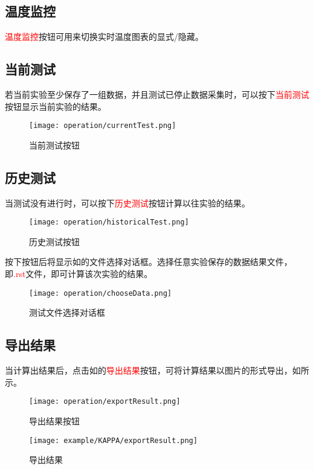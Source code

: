 \subsection{温度监控}
\textcolor{red}{温度监控}按钮可用来切换实时温度图表的显式/隐藏。

\subsection{当前测试}
若当前实验至少保存了一组数据，并且测试已停止数据采集时，可以按下\textcolor{red}{当前测试}按钮显示当前实验的结果。
\begin{figure}[H]
    \centering
    \texttt{[image: operation/currentTest.png]}
    \caption{ 当前测试按钮 \label{fig:btnCurrentTest}}
\end{figure}
\subsection{历史测试}
当测试没有进行时，可以按下\textcolor{red}{历史测试}按钮计算以往实验的结果。
\begin{figure}[H]
    \centering
    \texttt{[image: operation/historicalTest.png]}
    \caption{ 历史测试按钮 \label{fig:btnHistoricalTest}}
\end{figure}
按下按钮后将显示如的文件选择对话框。选择任意实验保存的数据结果文件，即\textcolor{red}{.rst}文件，即可计算该次实验的结果。
\begin{figure}[H]
    \centering
    \texttt{[image: operation/chooseData.png]}
    \caption{  测试文件选择对话框 \label{fig:chooseData}}
\end{figure}
\subsection{导出结果}
当计算出结果后，点击如的\textcolor{red}{导出结果}按钮，可将计算结果以图片的形式导出，如所示。

\begin{figure}[H]
    \centering
    \texttt{[image: operation/exportResult.png]}
    \caption{  导出结果按钮 \label{fig:btnExportResult}}
\end{figure}
\begin{figure}[H]
    \centering
    \texttt{[image: example/KAPPA/exportResult.png]}
    \caption{  导出结果 \label{fig:exportResult}}
\end{figure}
